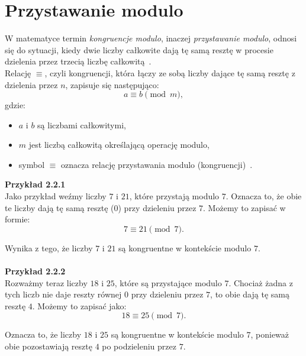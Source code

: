 \documentclass{SGGW-thesis}
\begin{document}
	\section{Przystawanie modulo}
	W matematyce termin \textit{kongruencje modulo}, inaczej \textit{przystawanie modulo}, odnosi się do sytuacji, kiedy dwie liczby całkowite dają tę samą resztę w procesie dzielenia przez trzecią liczbę całkowitą~\cite{ajakubiec}\cite{kennweth}\cite{lewiszax}.
	\\
	Relację \(\equiv\), czyli kongruencji, która łączy ze sobą liczby dające tę samą resztę z dzielenia przez \( n \), zapisuje się następująco:
	\begin{equation}
		a \equiv b \pmod{m},
	\end{equation}
	gdzie:
	\begin{itemize}
		\item \( a \) i \( b \) są liczbami całkowitymi,
		\item \( m \) jest liczbą całkowitą określającą operację modulo,
		\item symbol \( \equiv \) oznacza relację przystawania modulo (kongruencji)~\cite{r22modulo}\cite{lewiszax}.
	\end{itemize}
	\vspace{1em}
	\noindent \textbf{Przykład 2.2.1}
	\\
	Jako przykład weźmy liczby \( 7 \) i \( 21 \), które przystają modulo \( 7 \). Oznacza to, że obie te liczby dają tę samą resztę (\( 0 \)) przy dzieleniu przez \( 7 \). Możemy to zapisać w formie:
	\[ 7 \equiv 21 \pmod{7}. \]
	
	\noindent Wynika z tego, że liczby \( 7 \) i \( 21 \) są kongruentne w kontekście modulo \( 7 \).
	\\
	\\
	\noindent \textbf{Przykład 2.2.2}
	\\
	Rozważmy teraz liczby \( 18 \) i \( 25 \), które są przystające modulo \( 7 \). Chociaż żadna z tych liczb nie daje reszty równej \( 0 \) przy dzieleniu przez \( 7 \), to obie dają tę samą resztę \( 4 \). Możemy to zapisać jako:
	\[ 18 \equiv 25 \pmod{7}. \]
	
	\noindent Oznacza to, że liczby \( 18 \) i \( 25 \) są kongruentne w kontekście modulo \( 7 \), ponieważ obie pozostawiają resztę \( 4 \) po podzieleniu przez \( 7 \).
	\newpage
	
\end{document}
